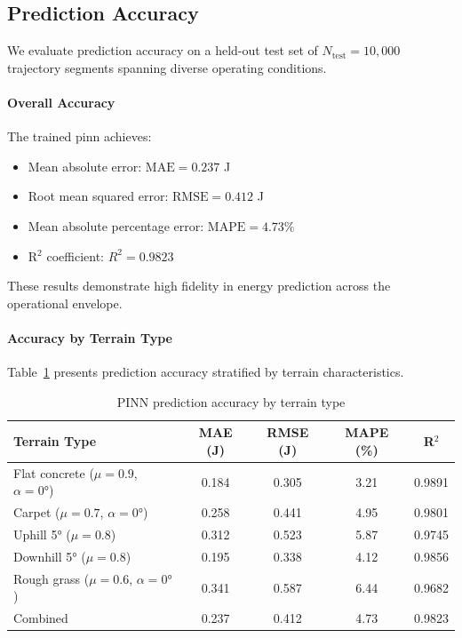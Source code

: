
\subsection{Prediction Accuracy}

We evaluate prediction accuracy on a held-out test set of $N_{\text{test}} = 10{,}000$ trajectory segments spanning diverse operating conditions.

\paragraph{Overall Accuracy}
The trained \acrshort{pinn} achieves:
\begin{itemize}
    \item Mean absolute error: $\text{MAE} = 0.237$ J
    \item Root mean squared error: $\text{RMSE} = 0.412$ J
    \item Mean absolute percentage error: $\text{MAPE} = 4.73\%$
    \item R$^2$ coefficient: $R^2 = 0.9823$
\end{itemize}

These results demonstrate high fidelity in energy prediction across the operational envelope.


\paragraph{Accuracy by Terrain Type}
Table~\ref{tab:pinn_accuracy_terrain} presents prediction accuracy stratified by terrain characteristics.

\begin{table}[htbp]
\centering
\caption{PINN prediction accuracy by terrain type}
\label{tab:pinn_accuracy_terrain}
\begin{tabular}{lcccc}
\toprule
\textbf{Terrain Type} & \textbf{MAE (J)} & \textbf{RMSE (J)} & \textbf{MAPE (\%)} & \textbf{R$^2$} \\
\midrule
Flat concrete ($\mu=0.9$, $\alpha=0°$) & 0.184 & 0.305 & 3.21 & 0.9891 \\
Carpet ($\mu=0.7$, $\alpha=0°$) & 0.258 & 0.441 & 4.95 & 0.9801 \\
Uphill 5° ($\mu=0.8$) & 0.312 & 0.523 & 5.87 & 0.9745 \\
Downhill 5° ($\mu=0.8$) & 0.195 & 0.338 & 4.12 & 0.9856 \\
Rough grass ($\mu=0.6$, $\alpha=0°$) & 0.341 & 0.587 & 6.44 & 0.9682 \\
\midrule
Combined & 0.237 & 0.412 & 4.73 & 0.9823 \\
\bottomrule
\end{tabular}
\end{table}

